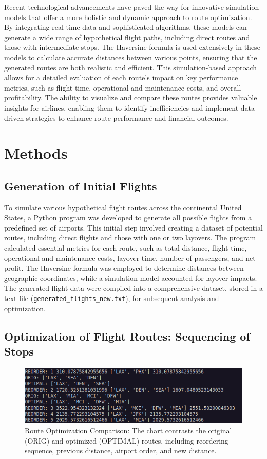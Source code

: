 \documentclass{article}
\begin{document}
Recent technological advancements have paved the way for innovative simulation models that offer a more holistic and dynamic approach to route optimization. By integrating real-time data and sophisticated algorithms, these models can generate a wide range of hypothetical flight paths, including direct routes and those with intermediate stops. The Haversine formula is used extensively in these models to calculate accurate distances between various points, ensuring that the generated routes are both realistic and efficient. This simulation-based approach allows for a detailed evaluation of each route's impact on key performance metrics, such as flight time, operational and maintenance costs, and overall profitability. The ability to visualize and compare these routes provides valuable insights for airlines, enabling them to identify inefficiencies and implement data-driven strategies to enhance route performance and financial outcomes.

\section{Methods}
\subsection*{Generation of Initial Flights}
To simulate various hypothetical flight routes across the continental United States, a Python program was developed to generate all possible flights from a predefined set of airports. This initial step involved creating a dataset of potential routes, including direct flights and those with one or two layovers. The program calculated essential metrics for each route, such as total distance, flight time, operational and maintenance costs, layover time, number of passengers, and net profit. The Haversine formula was employed to determine distances between geographic coordinates, while a simulation model accounted for layover impacts. The generated flight data were compiled into a comprehensive dataset, stored in a text file (\texttt{generated\_flights\_new.txt}), for subsequent analysis and optimization. 

\subsection*{Optimization of Flight Routes: Sequencing of Stops}
\begin{figure}[h!] 
\centering
\includegraphics[width=\textwidth]{images/sorting_alg.png}
\caption{Route Optimization Comparison: The chart contrasts the original (ORIG) and optimized (OPTIMAL) routes, including reordering sequence, previous distance, airport order, and new distance.}
\label{fig:sorting}
\end{figure}
\end{document}
